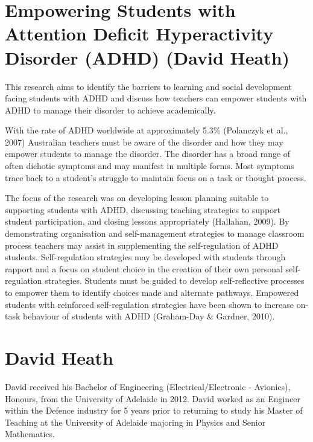 \documentclass[twoside,12pt,a4paper,notitlepage]{memoir}
\begin{document}
\pagebreak
\section*{Empowering Students with Attention Deficit Hyperactivity Disorder (ADHD) (David Heath)}
\label{aut:heath}

This research aims to identify the barriers to learning and social development facing students with ADHD and discuss how teachers can empower students with ADHD to manage their disorder to achieve academically.


With the rate of ADHD worldwide at approximately 5.3\% (Polanczyk et al., 2007) Australian teachers must be aware of the disorder and how they may empower students to manage the disorder. The disorder has a broad range of often dichotic symptoms and may manifest in multiple forms. Most symptoms trace back to a student’s struggle to maintain focus on a task or thought process.


The focus of the research was on developing lesson planning suitable to supporting students with ADHD, discussing teaching strategies to support student participation, and closing lessons appropriately (Hallahan, 2009). By demonstrating organisation and self-management strategies to manage classroom process teachers may assist in supplementing the self-regulation of ADHD students. Self-regulation strategies may be developed with students through rapport and a focus on student choice in the creation of their own personal self-regulation strategies. Students must be guided to develop self-reflective processes to empower them to identify choices made and alternate pathways. Empowered students with reinforced self-regulation strategies have been shown to increase on-task behaviour of students with ADHD (Graham-Day \& Gardner, 2010).

\section*{David Heath}

David received his Bachelor of Engineering (Electrical/Electronic - Avionics), Honours, from the University of Adelaide in 2012. David worked as an Engineer within the Defence industry for 5 years prior to returning to study his Master of Teaching at the University of Adelaide majoring in Physics and Senior Mathematics.
\end{document}
